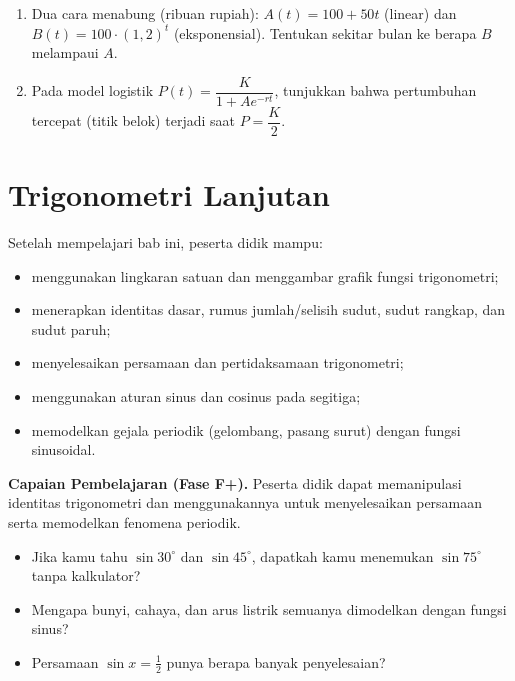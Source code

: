 \documentclass[11pt,a4paper]{report}
\theoremstyle{gaya}
\begin{document}
\begin{challenge}
\begin{enumerate}[leftmargin=*,topsep=2pt]
  \item Dua cara menabung (ribuan rupiah): $A(t)=100+50t$ (linear) dan $B(t)=100\cdot(1{,}2)^t$ (eksponensial). Tentukan sekitar bulan ke berapa $B$ melampaui $A$.
  \item Pada model logistik $P(t)=\dfrac{K}{1+Ae^{-rt}}$, tunjukkan bahwa pertumbuhan tercepat (titik belok) terjadi saat $P=\dfrac{K}{2}$.
\end{enumerate}
\end{challenge}

\chapter{Trigonometri Lanjutan}
\begin{tujuan}
Setelah mempelajari bab ini, peserta didik mampu:
\begin{itemize}[leftmargin=*,topsep=2pt]
  \item menggunakan lingkaran satuan dan menggambar grafik fungsi trigonometri;
  \item menerapkan identitas dasar, rumus jumlah/selisih sudut, sudut rangkap, dan sudut paruh;
  \item menyelesaikan persamaan dan pertidaksamaan trigonometri;
  \item menggunakan aturan sinus dan cosinus pada segitiga;
  \item memodelkan gejala periodik (gelombang, pasang surut) dengan fungsi sinusoidal.
\end{itemize}
\textbf{Capaian Pembelajaran (Fase F+).} Peserta didik dapat memanipulasi identitas trigonometri dan menggunakannya untuk menyelesaikan persamaan serta memodelkan fenomena periodik.
\end{tujuan}

\begin{pemantik}
\begin{itemize}[leftmargin=*,topsep=2pt]
  \item Jika kamu tahu $\sin30^\circ$ dan $\sin45^\circ$, dapatkah kamu menemukan $\sin75^\circ$ tanpa kalkulator?
  \item Mengapa bunyi, cahaya, dan arus listrik semuanya dimodelkan dengan fungsi sinus?
  \item Persamaan $\sin x=\tfrac12$ punya berapa banyak penyelesaian?
\end{itemize}
\end{pemantik}
\end{document}
